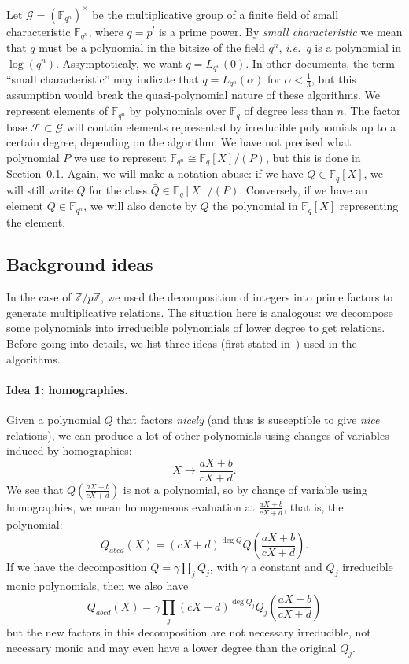 \documentclass[a4paper,11pt]{article}
\theoremstyle{break}
\theoremstyle{sc}
\theoremstyle{definition}
\theoremstyle{remark}
\newcommand{\ie}{\emph{i.e.\ }}
\begin{document}
Let $\mathcal G = (\mathbb{F}_{q^n})^\times$ be the multiplicative group of a finite
field of small characteristic $\mathbb{F}_{q^n}$, where $q=p^l$ is a prime
power. By
\emph{small characteristic} we mean that $q$ must be a polynomial in the bitsize of
the field $q^n$, \ie $q$ is a polynomial in $\log(q^n)$. Assymptoticaly, we want
$q= L_{q^n}(0)$. In other documents, the term ``small
characteristic'' may indicate that $q = L_{q^n}(\alpha)$ for
$\alpha<\frac{1}{3}$, but this assumption would break the quasi-polynomial
nature of these algorithms. We represent elements of
$\mathbb{F}_{q^n}$ by polynomials over $\mathbb{F}_{q}$ of degree less than
$n$. The factor base $\mathcal F\subset\mathcal G$ will contain elements
represented by irreducible polynomials up to a certain degree, depending on the
algorithm. We have not precised what polynomial $P$ we use to represent
$\mathbb{F}_{q^n}\cong\mathbb{F}_{q}[X]/(P)$, but this is done
in Section~\ref{ideas}. Again, we will make a notation abuse: if we have
$Q\in \mathbb{F}_{q}[X]$, we will still write $Q$ for the class $\bar Q\in
\mathbb{F}_{q}[X]/(P)$. Conversely, if we have an element $Q\in
\mathbb{F}_{q^{n}}$, we
will also denote by $Q$ the polynomial in $\mathbb{F}_{q}[X]$ representing the
element.

\subsection{Background ideas}
\label{ideas}

In the case of $\mathbb{Z}/p\mathbb{Z}$, we used the decomposition of
integers into prime factors to generate multiplicative relations. The situation
here is analogous: we decompose some polynomials into irreducible polynomials of
lower degree to get relations. Before going into details, we list three ideas
(first stated in~\cite{Joux13}) used in the algorithms.

\paragraph{Idea 1: homographies.} Given a polynomial $Q$ that factors \emph{nicely}
(and thus is susceptible to give \emph{nice} relations), we can produce a lot of other
polynomials using changes of variables induced by homographies:
\[
  X\to\frac{aX+b}{cX+d}.
\]
We see that $Q(\frac{aX+b}{cX+d})$ is not a polynomial, so by change of variable
using homographies, we mean homogeneous evaluation at $\frac{aX+b}{cX+d}$,
that is, the polynomial:
\[
  Q_{abcd}(X) = (cX+d)^{\deg Q}Q\left(\frac{aX+b}{cX+d} \right).
\]
If we have the decomposition $Q=\gamma\prod_j Q_j$, with $\gamma$ a constant and
$Q_j$ irreducible monic polynomials, then we also have
\[
  Q_{abcd}(X) = \gamma\prod_j (cX+d)^{\deg Q_j}Q_j(\frac{aX+b}{cX+d})
\]
but the new factors in this decomposition are not necessary irreducible, not
necessary monic and may even have a lower degree than the original $Q_j$.
\end{document}
